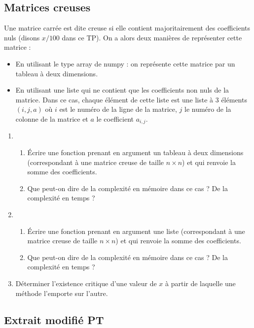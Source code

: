\documentclass[french,11pt,twoside]{VcCours}
\begin{document}
\subsection{Matrices creuses}

Une matrice carrée est dite creuse si elle contient majoritairement des coefficients nuls (disons $x/100$ dans ce TP). On a alors deux manières de représenter cette matrice :

\begin{itemize}
\item En utilisant le type array de numpy : on représente cette matrice par un tableau à deux dimensions.
\item En utilisant une liste qui ne contient que les coefficients non nuls de la matrice. Dans ce cas, chaque élément de cette liste est une liste à 3 éléments $(i,j,a)$ où $i$ est le numéro de la ligne de la matrice, $j$ le numéro de la colonne de la matrice et $a$ le coefficient $a_{i,j}$.
\end{itemize}

\begin{enumerate}
\item
\begin{enumerate}
\item Écrire une fonction  prenant en argument un tableau à deux dimensions (correspondant à une matrice creuse de taille $n \times n$) et qui renvoie la somme des coefficients.
\item Que peut-on dire de la complexité en mémoire dans ce cas ? De la complexité en temps ?
\end{enumerate}
\item \begin{enumerate}
\item Écrire une fonction  prenant en argument une liste (correspondant à une matrice creuse de taille $n \times n$) et qui renvoie la somme des coefficients.
\item Que peut-on dire de la complexité en mémoire dans ce cas ? De la complexité en temps ?
\end{enumerate}
\item Déterminer l'existence critique d'une valeur de $x$ à partir de laquelle une méthode l'emporte sur l'autre.
\end{enumerate}

\subsection{Extrait modifié PT}
\end{document}
